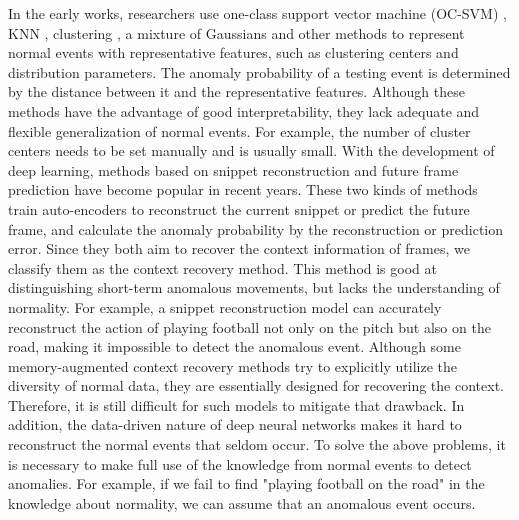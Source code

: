 \documentclass[lettersize,journal]{IEEEtran}
\begin{document}
In the early works, researchers use one-class support vector machine (OC-SVM) \cite{LearningDeep2015xua, DeepAppearance2017smeureanu, ObjectCentricAutoEncoders2019ionescua}, KNN \cite{VideoAnomaly2012saligramaa, StreetScene2020ramachandraa}, clustering \cite{DetectingAbnormal2019ionescua, ClusterAttention2020wanga, GraphEmbedded2020markovitza, ClusteringDriven2020chang}, a mixture of Gaussians \cite{GaussianProcess2015cheng, VideoAnomaly2020fana} and other methods to represent normal events with representative features, such as clustering centers and distribution parameters.
The anomaly probability of a testing event is determined by the distance between it and the representative features.
Although these methods have the advantage of good interpretability, they lack adequate and flexible generalization of normal events.
For example, the number of cluster centers needs to be set manually and is usually small.
With the development of deep learning, methods based on snippet reconstruction and future frame prediction \cite{FutureFrame2018liua, MemorizingNormality2019gonga, ClozeTest2020yu, BMANBidirectional2020lee, LearningMemoryGuided2020parka, FutureFrame2021luo, SmithNetStrictness2021nguyen, LearningNormal2021lva, HybridVideo2021liua, AppearanceMotionMemory2021caia, RobustUnsupervised2021wanga, MultiEncoderEffective2021fang, AnomalyDetection2022fang, VariationalAbnormal2022li, SelfSupervisedAttentive2022huang, InfluenceawareAttention2022zhang} have become popular in recent years.
These two kinds of methods train auto-encoders to reconstruct the current snippet or predict the future frame, and calculate the anomaly probability by the reconstruction or prediction error.
Since they both aim to recover the context information of frames, we classify them as the context recovery method.
This method is good at distinguishing short-term anomalous movements, but lacks the understanding of normality.
For example, a snippet reconstruction model can accurately reconstruct the action of playing football not only on the pitch but also on the road, making it impossible to detect the anomalous event.
Although some memory-augmented context recovery methods \cite{MemorizingNormality2019gonga, LearningMemoryGuided2020parka, LearningNormal2021lva, HybridVideo2021liua, AppearanceMotionMemory2021caia} try to explicitly utilize the diversity of normal data, they are essentially designed for recovering the context.
Therefore, it is still difficult for such models to mitigate that drawback.
In addition, the data-driven nature of deep neural networks makes it hard to reconstruct the normal events that seldom occur.
To solve the above problems, it is necessary to make full use of the knowledge from normal events to detect anomalies. 
For example, if we fail to find "playing football on the road" in the knowledge about normality, we can assume that an anomalous event occurs.
\end{document}
